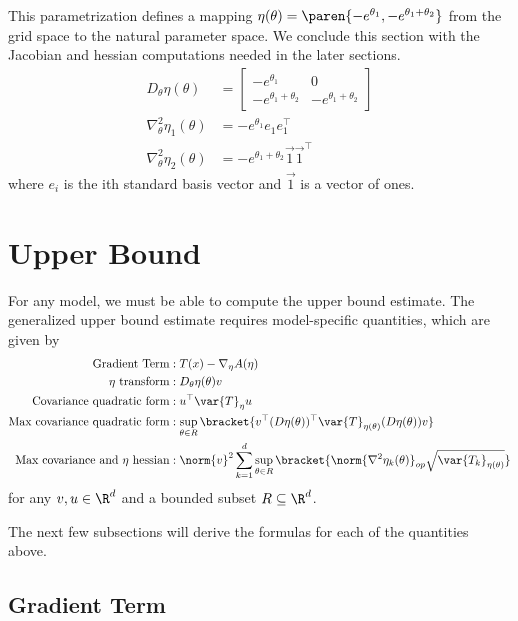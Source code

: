 \documentclass[10pt, a4paper]{article}
\begin{document}
This parametrization defines a mapping $\eta(\theta) = \paren{-e^{\theta_1}, -e^{\theta_1+\theta_2}}$
from the grid space to the natural parameter space.
We conclude this section with the Jacobian and hessian computations
needed in the later sections.
\begin{align}
    D_\theta \eta(\theta)
    &=
    \begin{bmatrix}
        -e^{\theta_1} & 0 \\
        -e^{\theta_1+\theta_2} & -e^{\theta_1+\theta_2}
    \end{bmatrix}
    \label{eq:eta-jac}
    \\
    \nabla^2_\theta \eta_1(\theta)
    &=
    -e^{\theta_1} e_1e_1^\top 
    \label{eq:eta-1-hess}
    \\
    \nabla^2_\theta \eta_2(\theta)
    &=
    -e^{\theta_1+\theta_2} \vec{1} \vec{1}^\top
    \label{eq:eta-2-hess}
\end{align}
where $ e_i$ is the ith standard basis vector 
and $ \vec{1}$ is a vector of ones.

\section{Upper Bound}

For any model, we must be able to compute
the upper bound estimate.
The generalized upper bound estimate requires model-specific quantities,
which are given by
\begin{align*}
    \text{Gradient Term}&: T(x) - \nabla_\eta A(\eta) \\
    \text{$\eta$ transform}&: D_\theta\eta(\theta) v \\
    \text{Covariance quadratic form}&: u^\top \var{T}_{\eta} u \\
    \text{Max covariance quadratic form}&:
    \sup\limits_{\theta \in R} \bracket{v^\top (D\eta(\theta))^\top \var{T}_{\eta(\theta)} (D\eta(\theta)) v} \\
    \text{Max covariance and $\eta$ hessian}&: 
    \norm{v}^2
    \sum\limits_{k=1}^d
    \sup\limits_{\theta \in R}
    \bracket{%
        \norm{\nabla^2 \eta_k(\theta)}_{op}
        \sqrt{\var{T_k}_{\eta(\theta)}}
    }
\end{align*}
for any $v, u \in \R^d$ and a bounded subset $R \subseteq \R^d$.

The next few subsections will derive the formulas
for each of the quantities above.

\subsection{Gradient Term}
\end{document}
